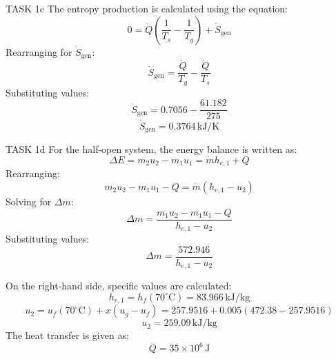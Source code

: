 TASK 1c  
The entropy production is calculated using the equation:  
\[
0 = \dot{Q} \left( \frac{1}{T_s} - \frac{1}{T_g} \right) + \dot{S}_{\text{gen}}
\]  
Rearranging for \( \dot{S}_{\text{gen}} \):  
\[
\dot{S}_{\text{gen}} = \frac{\dot{Q}}{T_g} - \frac{\dot{Q}}{T_s}
\]  
Substituting values:  
\[
\dot{S}_{\text{gen}} = 0.7056 - \frac{61.182}{275}
\]  
\[
\dot{S}_{\text{gen}} = 0.3764 \, \text{kJ/K}
\]  

TASK 1d  
For the half-open system, the energy balance is written as:  
\[
\Delta E = m_2 u_2 - m_1 u_1 = \dot{m} h_{e,1} + Q
\]  
Rearranging:  
\[
m_2 u_2 - m_1 u_1 - Q = \dot{m} (h_{e,1} - u_2)
\]  
Solving for \( \Delta m \):  
\[
\Delta m = \frac{m_1 u_2 - m_1 u_1 - Q}{h_{e,1} - u_2}
\]  
Substituting values:  
\[
\Delta m = \frac{572.946}{h_{e,1} - u_2}
\]  

On the right-hand side, specific values are calculated:  
\[
h_{e,1} = h_f(70^\circ\text{C}) = 83.966 \, \text{kJ/kg}
\]  
\[
u_2 = u_f(70^\circ\text{C}) + x(u_g - u_f) = 257.9516 + 0.005(472.38 - 257.9516)
\]  
\[
u_2 = 259.09 \, \text{kJ/kg}
\]  
The heat transfer is given as:  
\[
Q = 35 \times 10^6 \, \text{J}
\]